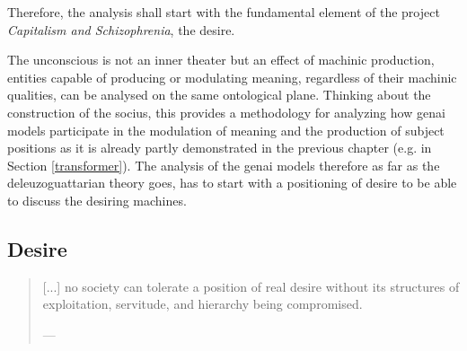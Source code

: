 %
%


Therefore, the analysis shall start with the fundamental element of the project
\textit{Capitalism and Schizophrenia}, the desire.

\begin{orangebox}


	The unconscious is not an inner theater but an effect of machinic production, entities capable of producing or modulating meaning, regardless of their machinic qualities, can be analysed on the same ontological plane. Thinking about the construction of the socius, this provides a methodology for analyzing how \gls{genai} models participate in the modulation of meaning and the production of subject positions as it is already partly demonstrated in the previous chapter (e.g. in Section \ref{transformer}). The analysis of the \gls{genai} models therefore as far as the deleuzoguattarian theory goes, has to start with a positioning of desire to be able to discuss the desiring machines.

\end{orangebox}

\subsection{Desire}\label{desire}

\begin{quote}
	[...] no society can tolerate a position of real desire without its structures of exploitation, servitude, and hierarchy being compromised.

	— \cite[126]{deleuze1983}
\end{quote}



